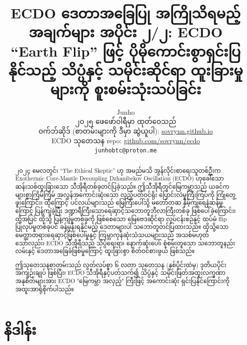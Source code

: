 \documentclass[10pt,twocolumn,letterpaper]{article}
\begin{document}
\title{ECDO ဒေတာအခြေပြု အကြိုသိရမည့်အချက်များ အပိုင်း ၂/၂: ECDO “Earth Flip” ဖြင့် ပိုမိုကောင်းစွာရှင်းပြနိုင်သည့် သိပ္ပံနှင့် သမိုင်းဆိုင်ရာ ထူးခြားမှုများကို စူးစမ်းသုံးသပ်ခြင်း}

\author{Junho\\
၂၀၂၅ ဖေဖော်ဝါရီမှာ ထုတ်ဝေသည်\\
ဝက်ဘ်ဆိုဒ် (စာတမ်းများကို ဒီမှာ ဆွဲယူပါ): \href{https://sovrynn.github.io}{sovrynn.github.io}\\
ECDO သုတေသန repo: \href{https://github.com/sovrynn/ecdo}{github.com/sovrynn/ecdo}\\
{\tt\small junhobtc@proton.me}
}

\maketitle

\begin{abstract}
၂၀၂၄ မေလတွင်၊ “The Ethical Skeptic” \cite{0} ဟု အမည်မသိ အွန်လိုင်းစာရေးသူတစ်ဦးက Exothermic Core-Mantle Decoupling Dzhanibekov Oscillation (ECDO) \cite{1} ဟုခေါ်သော ဆန်းသစ်ထူးခြားသော သီအိုရီတစ်ခုတင်ပြခဲ့သည်။ ဤသီအိုရီတွင်မြေကမ္ဘာသည် ယခင်က များစွာကြိမ်ကြိမ် အလွန်အကောင်းဆုံးသော လှည့်ပတ်ဝင်ရိုး ပြောင်းလဲမှုကြီးကြပ်ကို ကြုံတွေ့ဖူးကြောင်း၊ ထိုကြောင့် ပင်လယ်များသည် မြေကြီးပေါ်သို့ မတော်တဆ နှိမ့်ကျရေနံဆန်မှုကြောင့် ပြန့်ကျဲခဲ့ပြီး ဒဏ္ဍာရီကြီးသောရေဆှာင့်သဘောတူဘီလာကြီးတစ်ခု ဖြစ်ပေါ်ခဲ့ကြောင်း၊ ထို့အပြင် ထိုသို့ ပြန့်ကျဲမှုတစ်ခုကို ဖြစ်စေသော မြေဗေဒဆိုင်ရာ လုပ်ငန်းစဉ်နှင့် ထပ်မံ flip ပြုလုပ်မှုတစ်ခုပင် ခန့်မှန်းရနိုင်မည့် ဒေတာများပါ သဘောတူတင်ပြထားသည်။ ထိုသို့သော မေတ္တာတရားရေဆှာင့်ဖြစ်ပေါ်မှုနှင့် ကြမ္ဘာကုန်ဆုံးသံသယများသည် အသစ်မဟုတ်သော်လည်း၊ ECDO သီအိုရီသည် သိပ္ပံရေးရာ၊ နောက်ဆုံးပေါ်၊ စုံစမ်းတူသော သဘောတူနည်းလမ်းနှင့် ဒေတာအခြေခံဖြစ်မှုကြောင့် ထူးခြားစွာ စိတ်ဝင်စားဖွယ် ဖြစ်သည်။

ဤသုတေသနစာတမ်းသည် လွတ်လပ်စွာ ၆ လတာ သုတေသန (နှစ်ပိုင်းထဲမှ) ဒုတိယပိုင်း အကျဉ်းချုပ် ဖြစ်ပြီး၊ ECDO သီအိုရီနှင့်ပတ်သက်၍ သိပ္ပံနှင့် သမိုင်းဖြတ်အထူးလက္ခဏာအနုစိတ်များအား ECDO "မြေကမ္ဘာ အလှည့်" ကြီးဖြင့် အကောင်းဆုံး ရှင်းပြနိုင်ကြောင်းကို အထူးအာရုံစိုက်ပါသည်။ 

\end{abstract}

\section{နိဒါန်း}
\end{document}
